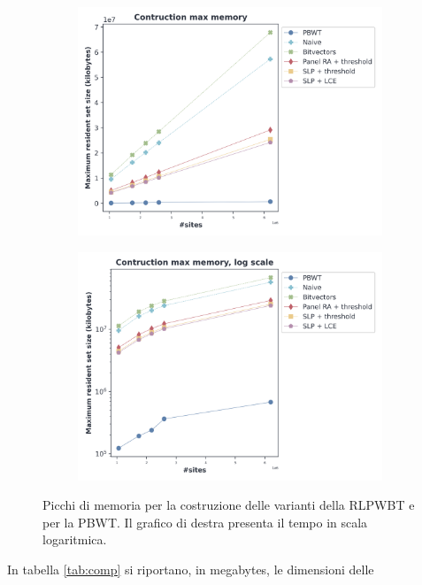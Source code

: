 \begin{figure}
  \centering
  \begin{subfigure}{.5\textwidth}
    \centering
    \includegraphics[width=\linewidth]{img/make_mem.png}
  \end{subfigure}%
  \begin{subfigure}{.5\textwidth}
    \centering
    \includegraphics[width=\linewidth]{img/make_mem_log.png}
  \end{subfigure}
  \caption{Picchi di memoria per la costruzione delle varianti della RLPWBT e
    per la PBWT. Il grafico di destra presenta il tempo in scala logaritmica.}
  \label{fig:makememchr}
\end{figure}
In tabella \ref{tab:comp} si riportano, in megabytes, le dimensioni delle
